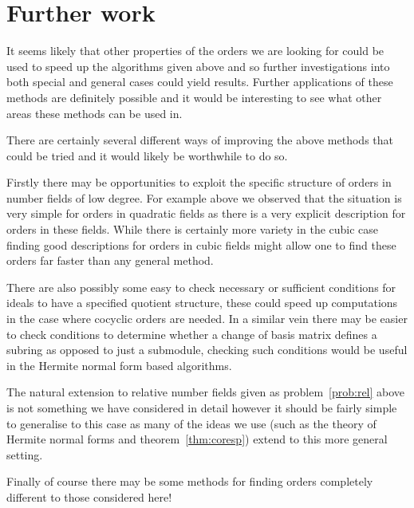 \documentclass[12pt,a4paper,abstracton,bibtotoc]{scrreprt}
\theoremstyle{definition}
\begin{document}
\section{Further work}
It seems likely that other properties of the orders we are looking for could be used to speed up the algorithms given above and so further investigations into both special and general cases could yield results.
Further applications of these methods are definitely possible and it would be interesting to see what other areas these methods can be used in. %

There are certainly several different ways of improving the above methods that could be tried and it would likely be worthwhile to do so.

Firstly there may be opportunities to exploit the specific structure of orders in number fields of low degree.
For example above we observed that the situation is very simple for orders in quadratic fields as there is a very explicit description for orders in these fields.
While there is certainly more variety in the cubic case finding good descriptions for orders in cubic fields might allow one to find these orders far faster than any general method.

There are also possibly some easy to check necessary or sufficient conditions for ideals to have a specified quotient structure, these could speed up computations in the case where cocyclic orders are needed.
In a similar vein there may be easier to check conditions to determine whether a change of basis matrix defines a subring as opposed to just a submodule, checking such conditions would be useful in the Hermite normal form based algorithms.

The natural extension to relative number fields given as problem~\ref{prob:rel} above is not something we have considered in detail however it should be fairly simple to generalise to this case as many of the ideas we use (such as the theory of Hermite normal forms and theorem~\ref{thm:coresp}) extend to this more general setting.

Finally of course there may be some methods for finding orders completely different to those considered here!
\end{document}
